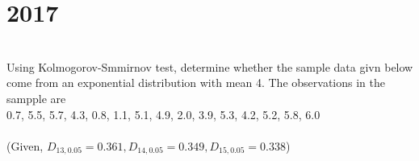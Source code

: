 \section*{2017}
\vspace{-.5cm}
\hrulefill \smallskip\\
 Using Kolmogorov-Smmirnov test, determine whether the sample data givn below come from an exponential distribution with mean 4. The observations in the sampple are \\

0.7, 5.5, 5.7, 4.3, 0.8, 1.1, 5.1, 4.9, 2.0, 3.9, 5.3, 4.2, 5.2, 5.8, 6.0 \\ \\(Given, $D_{13,0.05} = 0.361, D_{14,0.05} = 0.349, D_{15,0.05} = 0.338$)


